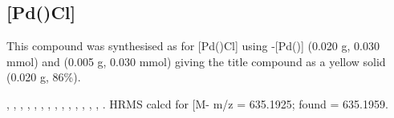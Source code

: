 \subsection*{[Pd(\tBuxantphosk)Cl]}


This compound was synthesised as for [Pd(\tButhixantphosk)Cl] using \trans{}-[Pd(\tBuxantphos)] (0.020 g, 0.030 mmol) and  (0.005 g, 0.030 mmol) giving the title compound as a yellow solid (0.020 g, 86\%).

\begin{sloppypar}
,
,
,
,
,
,
,
,
,
,
,
,
,
,
.
HRMS calcd for  [M-\ce{PF6]+} m/z = 635.1925; found = 635.1959.
\end{sloppypar}

